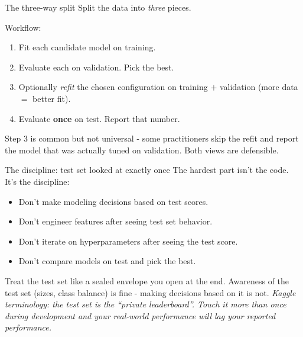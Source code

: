\documentclass[aspectratio=169]{beamer}
\begin{document}
\begin{frame}{The three-way split}
  Split the data into \emph{three} pieces.
  \vfill
  \begin{center}
  \end{center}
  \vfill
  Workflow:
  \begin{enumerate}
    \item Fit each candidate model on \textcolor{armblue}{training}.
    \item Evaluate each on \textcolor{armorange!80!black}{validation}. Pick the best.
    \item Optionally \emph{refit} the chosen configuration on training $+$ validation (more data $=$ better fit).
    \item Evaluate \textbf{once} on \textcolor{armred}{test}. Report that number.
  \end{enumerate}
  \vfill
  \small Step 3 is common but not universal - some practitioners skip the refit and report the model that was actually tuned on validation. Both views are defensible.
\end{frame}

\begin{frame}{The discipline: test set looked at exactly once}
  The hardest part isn't the code. It's the discipline:
  \vfill
  \begin{itemize}
    \item Don't make modeling decisions based on test scores.
    \item Don't engineer features after seeing test set behavior.
    \item Don't iterate on hyperparameters after seeing the test score.
    \item Don't compare models on test and pick the best.
  \end{itemize}
  \vfill
  Treat the test set like a sealed envelope you open at the end. Awareness of the test set (sizes, class balance) is fine - making decisions based on it is not.
  \vfill
  \emph{Kaggle terminology: the test set is the ``private leaderboard''. Touch it more than once during development and your real-world performance will lag your reported performance.}
\end{frame}
\end{document}
